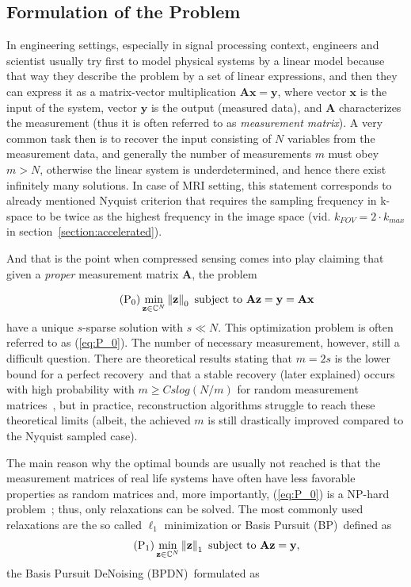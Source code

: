 \subsection{Formulation of the Problem}\label{section:problem formulation}
In engineering settings, especially in signal processing context, engineers and scientist usually try first to model physical systems by a linear model because that way they describe the problem by a set of linear expressions, and then they can express it as a matrix-vector multiplication $\mathbf{Ax} = \mathbf{y}$, where vector $\mathbf{x}$ is the input of the system, vector $\mathbf{y}$ is the output (measured data), and $\mathbf{A}$ characterizes the measurement (thus it is often referred to as \textit{measurement matrix}). A very common task then is to recover the input consisting of $N$ variables from the measurement data, and generally the number of measurements $m$ must obey $m > N$, otherwise the linear system is underdetermined, and hence there exist infinitely many solutions. In case of MRI setting, this statement corresponds to already mentioned Nyquist criterion that requires the sampling frequency in k-space to be twice as the highest frequency in the image space (vid. $k_{FOV} = 2 \cdot k_{max}$ in section~\ref{section:accelerated}).

And that is the point when compressed sensing comes into play claiming that given a \textit{proper} measurement matrix $\mathbf{A}$, the problem

\begin{equation}
    \tag{P\textsubscript{0}}\label{eq:P_0}
    \min_{\mathbf{z} \in \mathbb{C}^N} \norm{\mathbf{z}}_0 \text{ subject to } \mathbf{Az} = \mathbf{y} = \mathbf{Ax}
\end{equation}
have a unique $s$-sparse solution with $s \ll N$. This optimization problem is often referred to as (\ref{eq:P_0}). The number of necessary measurement, however, still a difficult question. There are theoretical results stating that $m = 2s$ is the lower bound for a perfect recovery~\citationneeded and that a stable recovery (later explained) occurs with high probability with $m \ge C s log(N / m)$ for random measurement matrices~\citationneeded, but in practice, reconstruction algorithms struggle to reach these theoretical limits (albeit, the achieved $m$ is still drastically improved compared to the Nyquist sampled case).

The main reason why the optimal bounds are usually not reached is that the measurement matrices of real life systems have often have less favorable properties as random matrices and, more importantly, (\ref{eq:P_0}) is a NP-hard problem~\citationneeded; thus, only relaxations can be solved. The most commonly used relaxations are the so called $\ell_1$ minimization or Basis Pursuit (BP)~\citationneeded defined as
\begin{equation}
    \tag{P\textsubscript{1}}\label{eq:P_1}
    \min_{\mathbf{z} \in \mathbb{C}^N} \norm{\mathbf{z}}_1 \text{ subject to } \mathbf{Az} = \mathbf{y},
\end{equation}
the Basis Pursuit DeNoising (BPDN)~\citationneeded formulated as

